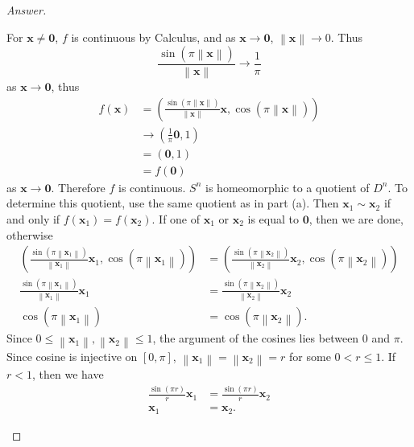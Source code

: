\documentclass[12pt]{article}
\newcommand\paren[1]{\left( #1 \right)}
\newcommand{\norm}[1]{\left \| #1 \right \|}
\theoremstyle{definition}
\begin{document}
\begin{proof}[Answer]
\begin{enumerate}[(a)]
        For $\mathbf{x} \neq \mathbf{0}$, $f$ is continuous by Calculus, and as $\mathbf{x} \to \mathbf{0}$, $\norm{ \mathbf{x} } \to 0$. Thus 
        \[
            \frac{ \sin \paren{ \pi \norm { \mathbf{x} } } }{\norm{\mathbf{x}}} \to \frac{1}{\pi}
        \]
        as $\mathbf{x} \to \mathbf{0}$, thus 
        \begin{align*}
            f \paren{ \mathbf{x} } & = \paren{ \frac{ \sin \paren{ \pi \norm { \mathbf{x} } } }{\norm{\mathbf{x}}} \mathbf{x} , \cos \paren{ \pi \norm{ \mathbf{x} } } } \\
            & \to \paren{ \frac{1}{\pi} \mathbf{0} , 1 } \\
            & = \paren{ \mathbf{0} , 1 } \\
            & = f \paren{ \mathbf{0} }
        \end{align*}
        as $\mathbf{x} \to \mathbf{0}$. Therefore $f$ is continuous. $S^n$ is homeomorphic to a quotient of $D^n$. To determine this quotient, use the same quotient as in part (a). Then $\mathbf{x}_1 \sim \mathbf{x}_2$ if and only if $f \paren{ \mathbf{x}_1 } = f \paren{ \mathbf{x}_2 }$. If one of $\mathbf{x}_1$ or $\mathbf{x}_2$ is equal to $\mathbf{0}$, then we are done, otherwise 
        \begin{align*}
            \paren{ \frac{ \sin \paren{ \pi \norm { \mathbf{x}_1 } } }{\norm{\mathbf{x}_1}} \mathbf{x}_1 , \cos \paren{ \pi \norm{ \mathbf{x}_1 } } } & = \paren{ \frac{ \sin \paren{ \pi \norm { \mathbf{x}_2 } } }{\norm{\mathbf{x}_2}} \mathbf{x}_2 , \cos \paren{ \pi \norm{ \mathbf{x}_2 } } } \\
            \frac{ \sin \paren{ \pi \norm { \mathbf{x}_1 } } }{\norm{\mathbf{x}_1}} \mathbf{x}_1 & = \frac{ \sin \paren{ \pi \norm { \mathbf{x}_2 } } }{\norm{\mathbf{x}_2}} \mathbf{x}_2 \\
            \cos \paren{ \pi \norm{ \mathbf{x}_1 } } & = \cos \paren{ \pi \norm{ \mathbf{x}_2 } }.
        \end{align*}
        Since $0 \leq \norm{ \mathbf{x}_1 } , \norm{ \mathbf{x}_2 } \leq 1$, the argument of the cosines lies between $0$ and $\pi$. Since cosine is injective on $[0,\pi]$, $\norm{ \mathbf{x}_1 } = \norm{ \mathbf{x}_2 } = r$ for some $0 < r \leq 1$. If $r < 1$, then we have 
        \begin{align*}
            \frac{ \sin \paren{ \pi r } }{r} \mathbf{x}_1 & = \frac{ \sin \paren{ \pi r } }{r} \mathbf{x}_2 \\
            \mathbf{x}_1 & = \mathbf{x}_2.
        \end{align*}

\end{enumerate}
\end{proof}
\end{document}
